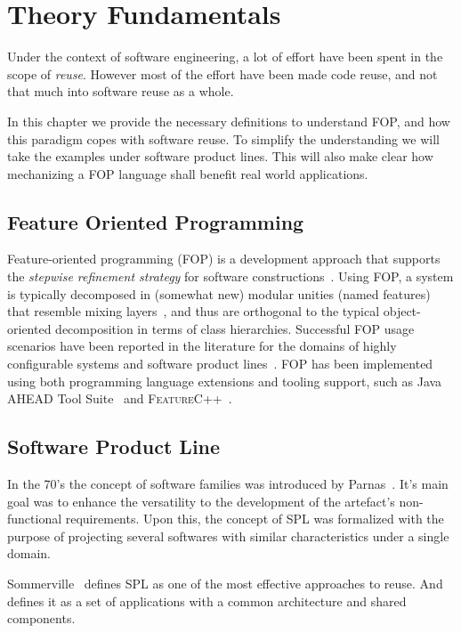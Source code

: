 \chapter{Theory Fundamentals}
Under the context of software engineering, a lot of effort have been spent in the scope of \textit{reuse}.
However most of the effort have been made code reuse, and not that much into software reuse as a whole.

In this chapter we provide the necessary definitions to understand \gls{FOP},
and how this paradigm copes with software reuse.
To simplify the understanding we will take the examples under software product lines.
This will also make clear how mechanizing a \gls{FOP} language shall benefit real world applications.


\section{Feature Oriented Programming}\label{seq:fop}

Feature-oriented programming (FOP) is a development approach 
that supports the \emph{stepwise refinement strategy} for software 
constructions~\cite{batory-tse2004}. Using FOP, a system is 
typically decomposed in (somewhat new) modular unities 
(named features) that resemble mixing layers~\cite{bracha-ecoop1990}, 
and thus are orthogonal to the typical object-oriented 
decomposition in terms of class hierarchies. 
Successful FOP usage scenarios have been reported in the literature 
for the domains of highly configurable systems and
software product lines~\cite{}.
FOP has been implemented using both programming 
language extensions and tooling support, such as 
Java AHEAD Tool Suite~\cite{batory_feature-oriented_2004} and \textsc{FeatureC++}~\cite{apel_featurec++:_2005}. 


\section{Software Product Line}
In the 70's the concept of software families was introduced by Parnas~\cite{parnas1976design}. 
It's main goal was to enhance the versatility to the development of the artefact's 
non-functional requirements. Upon this, the concept of \gls{SPL}
was formalized with the purpose of projecting several softwares
with similar characteristics under a single domain.

Sommerville~\cite{Sommerville:2010:SE:1841764} defines \gls{SPL} as one of the most effective approaches to reuse.
And defines it as a set of applications with a common architecture and shared components.

